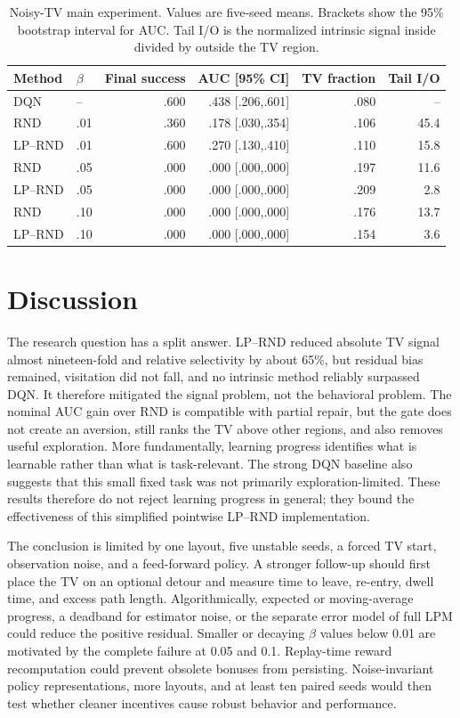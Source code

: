 \documentclass{article}
\newcommand{\lprnd}{LP--RND}
\begin{document}
\begin{table}[t]
\caption{Noisy-TV main experiment. Values are five-seed means. Brackets show
the 95\% bootstrap interval for AUC. Tail I/O is the normalized intrinsic
signal inside divided by outside the TV region.}
\label{tab:main}
\centering
\scriptsize
\setlength{\tabcolsep}{3.0pt}
\begin{tabular}{llrrrr}
\toprule
Method & $\beta$ & Final success & AUC [95\% CI] & TV fraction & Tail I/O \\
\midrule
DQN     & --   & .600 & .438 [.206,.601] & .080 & -- \\
RND     & .01  & .360 & .178 [.030,.354] & .106 & 45.4 \\
\lprnd  & .01  & .600 & .270 [.130,.410] & .110 & 15.8 \\
RND     & .05  & .000 & .000 [.000,.000] & .197 & 11.6 \\
\lprnd  & .05  & .000 & .000 [.000,.000] & .209 & 2.8 \\
RND     & .10  & .000 & .000 [.000,.000] & .176 & 13.7 \\
\lprnd  & .10  & .000 & .000 [.000,.000] & .154 & 3.6 \\
\bottomrule
\end{tabular}
\end{table}

\section{Discussion}
The research question has a split answer. \lprnd{} reduced absolute TV signal
almost nineteen-fold and relative selectivity by about 65\%, but residual bias
remained, visitation did not fall, and no intrinsic method reliably surpassed
DQN. It therefore mitigated the signal problem, not the behavioral problem.
The nominal AUC gain over RND is compatible with partial repair, but the gate
does not create an aversion, still ranks the TV above other regions, and also
removes useful exploration. More fundamentally, learning progress identifies
what is learnable rather than what is task-relevant. The strong DQN baseline
also suggests that this small fixed task was not primarily exploration-limited.
These results therefore do not reject learning progress in general; they bound
the effectiveness of this simplified pointwise \lprnd{} implementation.

The conclusion is limited by one layout, five unstable seeds, a forced TV
start, observation noise, and a feed-forward policy. A stronger follow-up
should first place the TV on an optional detour and measure time to leave,
re-entry, dwell time, and excess path length. Algorithmically, expected or
moving-average progress, a deadband for estimator noise, or the separate error
model of full LPM could reduce the positive residual. Smaller or decaying
$\beta$ values below 0.01 are motivated by the complete failure at 0.05 and
0.1. Replay-time reward recomputation could prevent obsolete bonuses from
persisting. Noise-invariant policy representations, more layouts, and at
least ten paired seeds would then test whether cleaner incentives cause robust
behavior and performance.
\end{document}
